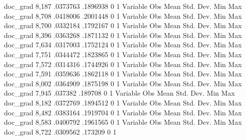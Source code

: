     doc_grad {\VBAR}      8,187    .0373763    .1896938          0          1
{\smallskip}
    Variable {\VBAR}        Obs        Mean    Std. Dev.       Min        Max
    doc_grad {\VBAR}      8,708    .0418006    .2001448          0          1
{\smallskip}
    Variable {\VBAR}        Obs        Mean    Std. Dev.       Min        Max
    doc_grad {\VBAR}      8,700    .0332184    .1792167          0          1
{\smallskip}
    Variable {\VBAR}        Obs        Mean    Std. Dev.       Min        Max
    doc_grad {\VBAR}      8,396    .0363268    .1871132          0          1
{\smallskip}
    Variable {\VBAR}        Obs        Mean    Std. Dev.       Min        Max
    doc_grad {\VBAR}      7,634    .0317003    .1752124          0          1
{\smallskip}
    Variable {\VBAR}        Obs        Mean    Std. Dev.       Min        Max
    doc_grad {\VBAR}      7,751    .0344472    .1823865          0          1
{\smallskip}
    Variable {\VBAR}        Obs        Mean    Std. Dev.       Min        Max
    doc_grad {\VBAR}      7,572    .0314316    .1744926          0          1
{\smallskip}
    Variable {\VBAR}        Obs        Mean    Std. Dev.       Min        Max
    doc_grad {\VBAR}      7,591    .0359636    .1862118          0          1
{\smallskip}
    Variable {\VBAR}        Obs        Mean    Std. Dev.       Min        Max
    doc_grad {\VBAR}      8,002    .0364909    .1875198          0          1
{\smallskip}
    Variable {\VBAR}        Obs        Mean    Std. Dev.       Min        Max
    doc_grad {\VBAR}      7,945     .037382     .189708          0          1
{\smallskip}
    Variable {\VBAR}        Obs        Mean    Std. Dev.       Min        Max
    doc_grad {\VBAR}      8,182    .0372769    .1894512          0          1
{\smallskip}
    Variable {\VBAR}        Obs        Mean    Std. Dev.       Min        Max
    doc_grad {\VBAR}      8,482    .0383164    .1919704          0          1
{\smallskip}
    Variable {\VBAR}        Obs        Mean    Std. Dev.       Min        Max
    doc_grad {\VBAR}      8,583    .0400792    .1961565          0          1
{\smallskip}
    Variable {\VBAR}        Obs        Mean    Std. Dev.       Min        Max
    doc_grad {\VBAR}      8,722    .0309562     .173209          0          1
